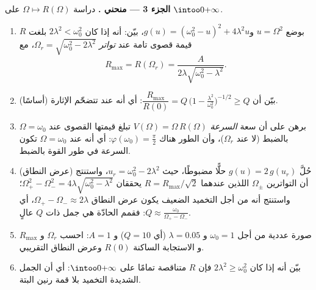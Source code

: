 \begin{problem}
\medskip
\noindent\textbf{الجزء 3 --- منحني .} دراسة
$\Omega \mapsto R(\Omega)$ على $\intoo0{+\infty}$.
\begin{enumerate}[resume]
  \item بوضع $u = \Omega^2$ و$g(u) = (\omega_0^2 - u)^2 +
        4\lambda^2 u$، بيّن: أنه إذا كان $2\lambda^2 < \omega_0^2$ بلغت $R$
        قيمة قصوى تامة عند \emph{تواتر }
        $\Omega_r = \sqrt{\omega_0^2 - 2\lambda^2}$، مع
        \[
        R_{\max} = R(\Omega_r)
        = \frac{A}{2\lambda\sqrt{\omega_0^2 - \lambda^2}} .
        \]
  \item بيّن أن $\dfrac{R_{\max}}{R(0)} = Q\,\bigl(1 -
        \tfrac{\lambda^2}{\omega_0^2}\bigr)^{-1/2} \geq Q$: أي أنه عند
         تتضخّم الإثارة  (أساسًا).
  \item برهن على أن سعة \emph{السرعة} $V(\Omega) =
        \Omega\,R(\Omega)$ تبلغ قيمتها القصوى عند $\Omega =
        \omega_0$ بالضبط (لا عند $\Omega_r$)، وأن الطور هناك
        $\varphi(\omega_0) = \frac\pi2$: أي أنه عند $\Omega = \omega_0$
        تكون السرعة في طور القوة بالضبط.
  \item (عرض النطاق) حُلَّ $g(u) = 2\,g(u_r)$ حلًّا مضبوطًا، حيث $u_r =
        \omega_0^2 - 2\lambda^2$، واستنتج أن التواترين
        $\Omega_\pm$ اللذين عندهما $R = R_{\max}/\sqrt2$
        يحققان $\Omega_+^2 - \Omega_-^2 =
        4\lambda\sqrt{\omega_0^2 - \lambda^2}$؛ واستنتج أنه من أجل
        التخميد الضعيف يكون عرض النطاق $\Omega_+ - \Omega_-
        \approx 2\lambda$، أي $Q \approx
        \frac{\omega_0}{\Omega_+ - \Omega_-}$: فقمم 
        الحادّة هي جمل ذات $Q$ عالٍ.
  \item صورة عددية من أجل $\omega_0 = 1$ و $\lambda = 0.05$
        (أي $Q = 10$) و $A = 1$: احسب $\Omega_r$ و $R_{\max}$ و
        الاستجابة الساكنة $R(0)$ وعرض النطاق التقريبي.
  \item بيّن أنه إذا كان $2\lambda^2 \geq \omega_0^2$ فإن $R$
        متناقصة تمامًا على $\intoo0{+\infty}$: أي أن الجمل الشديدة
        التخميد بلا قمة رنين البتة.
\end{enumerate}


\end{problem}
